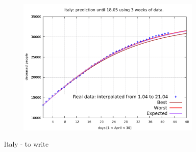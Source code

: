 \documentclass[8pt]{article}
\begin{document}
\begin{figure}[h!]
\begin{subfigure}[b]{0.45\linewidth}
  \includegraphics[width=\linewidth]{../tuned/it/1-21/1-21.pdf}
  \end{subfigure}
	\caption{Italy - to write}
\end{figure}
\end{document}
